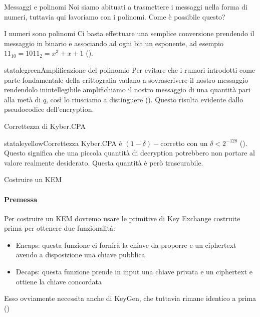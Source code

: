 \begin{frame}{Messaggi e polinomi}
    Noi siamo abituati a trasmettere i messaggi nella forma di numeri, tuttavia qui lavoriamo con i polinomi. Come è possibile questo?

    \begin{block}{I numeri sono polinomi}
        Ci basta effettuare una semplice conversione prendendo il messaggio in binario e associando ad ogni bit un esponente, ad esempio $11_{10}=1011_2=x^3+x+1$ (\cite{kyber17,babykyber}).
    \end{block}

    \begin{colorblock}{statalegreen}{Amplificazione del polinomio}
        Per evitare che i rumori introdotti come parte fondamentale della crittografia vadano a sovrascrivere il nostro messaggio rendendolo inintellegibile amplifichiamo il nostro messaggio di una quantità pari alla metà di $q$, così lo riusciamo a distinguere (\cite{kyber17,babykyber}). Questo risulta evidente dallo pseudocodice dell'encryption.
    \end{colorblock}
\end{frame}

    \begin{frame}{Correttezza di Kyber.CPA}

    \begin{colorblock}{stataleyellow}{Correttezza}
        Kyber.CPA è $(1-\delta)-$corretto con un $\delta<2^{-128}$ (\cite{kyber17}). Questo significa che una piccola quantità di decryption potrebbero non portare al valore realmente desiderato. Questa quantità è però trascurabile.
    \end{colorblock}

    \end{frame}

\begin{frame}{Costruire un KEM}
    \framesubtitle{Premessa}
    Per costruire un KEM dovremo usare le primitive di Key Exchange costruite prima per ottenere due funzionalità:\begin{itemize}
    \item Encaps: questa funzione ci fornirà la chiave da proporre e un ciphertext avendo a disposizione una chiave pubblica
    \item Decaps: questa funzione prende in input una chiave privata e un ciphertext e ottiene la chiave concordata
    \end{itemize}
    Esso ovviamente necessita anche di KeyGen, che tuttavia rimane identico a prima (\cite{kyber17})
\end{frame}

